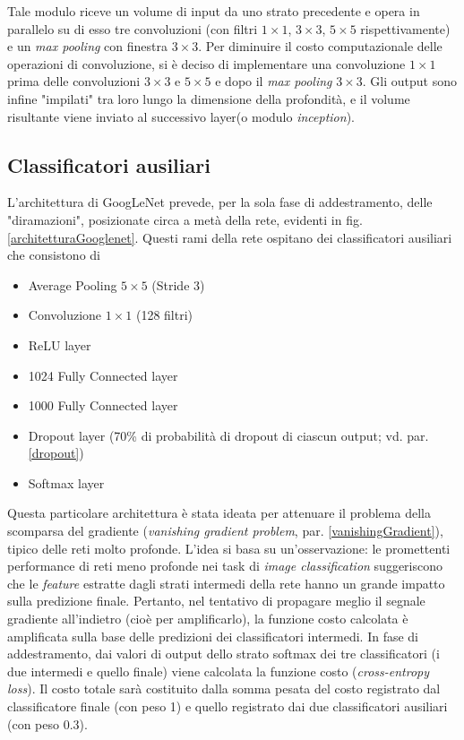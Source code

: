 Tale modulo riceve un volume di input da uno strato precedente e opera in parallelo su di esso tre convoluzioni (con filtri $1\times 1$, $3\times 3$, $5\times 5$ rispettivamente) e un \textit{max pooling} con finestra $3\times 3$. Per diminuire il costo computazionale delle operazioni di convoluzione, si è deciso di implementare una convoluzione $1\times 1$ prima delle convoluzioni $3\times 3$ e $5\times 5$ e dopo il \textit{max pooling} $3\times 3$.
Gli output sono infine "impilati" tra loro lungo la dimensione della profondità, e il volume risultante viene inviato al successivo layer(o modulo \textit{inception}).

\subsection{Classificatori ausiliari}
\label{classificatoriAusiliari}
L'architettura di GoogLeNet prevede, per la sola fase di addestramento, delle "diramazioni", posizionate circa a metà della rete, evidenti in fig. \ref{architetturaGooglenet}.
Questi rami della rete ospitano dei classificatori ausiliari che consistono di
\begin{itemize}
\item Average Pooling $5\times 5$ (Stride 3)
\item Convoluzione $1\times 1$ (128 filtri)
\item ReLU layer
\item 1024 Fully Connected layer
\item 1000 Fully Connected layer
\item Dropout layer (70\% di probabilità di dropout di ciascun output; vd. par. \ref{dropout})
\item Softmax layer
\end{itemize}
Questa particolare architettura è stata ideata per attenuare il problema della scomparsa del gradiente (\textit{vanishing gradient problem}, par. \ref{vanishingGradient}), tipico delle reti molto profonde. L'idea si basa su un'osservazione: le promettenti performance di reti meno profonde nei task di \textit{image classification} suggeriscono che le \textit{feature} estratte dagli strati intermedi della rete hanno un grande impatto sulla predizione finale. Pertanto, nel tentativo di propagare meglio il segnale gradiente all'indietro (cioè per amplificarlo), la funzione costo calcolata è amplificata sulla base delle predizioni dei classificatori intermedi.
In fase di addestramento, dai valori di output dello strato softmax dei tre classificatori (i due intermedi e quello finale) viene calcolata la funzione costo (\textit{cross-entropy loss}). 
Il costo totale sarà costituito dalla somma pesata del costo registrato dal classificatore finale (con peso 1) e quello registrato dai due classificatori ausiliari (con peso $0.3$).

